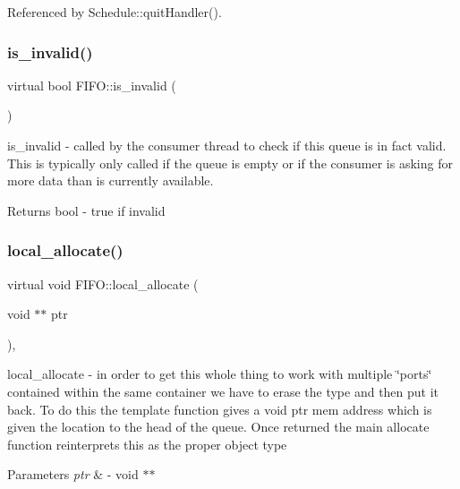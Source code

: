 Referenced by Schedule\+::quit\+Handler().

\hypertarget{class_f_i_f_o_a01bc45169bff5253496dc6bf6f902f89}{}\label{class_f_i_f_o_a01bc45169bff5253496dc6bf6f902f89} 
\subsubsection{\texorpdfstring{is\+\_\+invalid()}{is\_invalid()}}
{\footnotesize\ttfamily virtual bool F\+I\+F\+O\+::is\+\_\+invalid (\begin{DoxyParamCaption}{ }\end{DoxyParamCaption})\hspace{0.3cm}{\ttfamily [pure virtual]}}

is\+\_\+invalid -\/ called by the consumer thread to check if this queue is in fact valid. This is typically only called if the queue is empty or if the consumer is asking for more data than is currently available. \begin{DoxyReturn}{Returns}
bool -\/ true if invalid 
\end{DoxyReturn}
\hypertarget{class_f_i_f_o_a60068cb00b13626e41d4b11099354ae3}{}\label{class_f_i_f_o_a60068cb00b13626e41d4b11099354ae3} 
\subsubsection{\texorpdfstring{local\+\_\+allocate()}{local\_allocate()}}
{\footnotesize\ttfamily virtual void F\+I\+F\+O\+::local\+\_\+allocate (\begin{DoxyParamCaption}\item[{void $\ast$$\ast$}]{ptr }\end{DoxyParamCaption})\hspace{0.3cm}{\ttfamily [protected]}, {}}

local\+\_\+allocate -\/ in order to get this whole thing to work with multiple \char`\"{}ports\char`\"{} contained within the same container we have to erase the type and then put it back. To do this the template function gives a void ptr mem address which is given the location to the head of the queue. Once returned the main allocate function reinterprets this as the proper object type 
\begin{DoxyParams}{Parameters}
{\em ptr} & -\/ void $\ast$$\ast$ \\
\hline
\end{DoxyParams}
\hypertarget{class_f_i_f_o_a4acc34ebbad9df32f54ae8c618ffa0c0}{}\label{class_f_i_f_o_a4acc34ebbad9df32f54ae8c618ffa0c0} 
